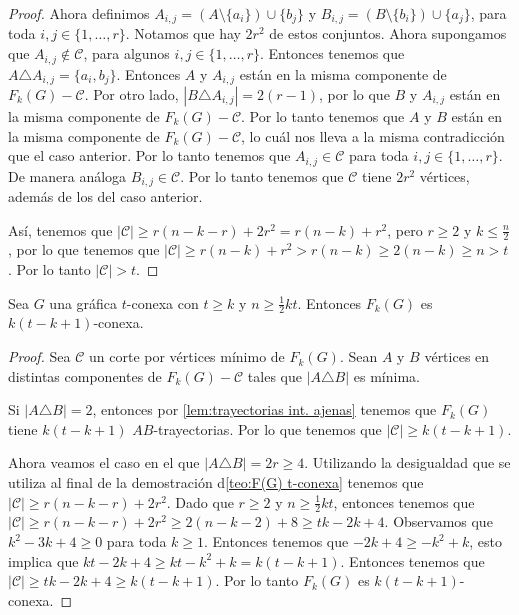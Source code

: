 \begin{proof}
Ahora definimos $A_{i,j} = (A\setminus \{a_i\}) \cup \{b_j\}$ y $B_{i,j} =
(B\setminus \{b_i\}) \cup \{a_j\}$, para toda $ i, j \in \{1, \dots, r\}$.
Notamos que hay $2r^2$ de estos conjuntos. Ahora supongamos que $A_{i,j} \notin
\mathcal{C}$, para algunos $ i, j \in \{1, \dots, r\}$. Entonces tenemos que $A
\triangle A_{i,j} = \{a_i, b_j\}$. Entonces $A$ y $A_{i,j}$ est\'an en la misma
componente de $F_k(G)- \mathcal{C}$. Por otro lado, $|B \triangle A_{i,j}| = 2
(r-1)$, por lo que $B$ y $A_{i,j}$ est\'an en la misma componente de $F_k(G) -
\mathcal{C}$. Por lo tanto tenemos que $A$ y $B$ est\'an en la misma componente
de $F_k(G)-\mathcal{C}$, lo cu\'al nos lleva a la misma contradicci\'on que el
caso anterior. Por lo tanto tenemos que $A_{i,j} \in \mathcal{C}$ para toda $i,
j \in \{1, \dots, r\}$. De manera an\'aloga $B_{i,j} \in \mathcal{C}$. Por lo
tanto tenemos que $\mathcal{C}$ tiene $2r^2$ v\'ertices, adem\'as de los del
caso anterior.

As\'i, tenemos que $|\mathcal{C}|\geq r(n-k-r)+2r^2 = r(n-k) + r^2$, pero $r
\geq 2$ y $k \leq \frac{n}{2}$, por lo que tenemos que $|\mathcal{C}| \geq
r(n-k)+r^2 > r(n-k) \geq 2(n-k) \geq n >t$. Por lo tanto $|\mathcal{C}|>t$.
\end{proof} 

\begin{teorema}%
    \label{teo:F(G) k (t- k+ 1)-conexa}
        Sea $G$ una gr\'afica $t$-conexa con $t \ge k$ y $n \ge \frac{1}{2} kt$.
        Entonces $F_{k}(G)$ es $k (t- k+ 1)$-conexa.
    \end{teorema}

    \begin{proof}
        Sea $\mathcal{C}$ un corte por v\'ertices m\'i{}nimo de $F_k(G)$. Sean
        $A$ y $B$ v\'ertices en distintas componentes de $F_k(G)- \mathcal{C}$
        tales que $|A \triangle B|$ es m\'i{}nima.

        Si $|A \triangle B| = 2$, entonces por \cref{lem:trayectorias int. ajenas} tenemos que
        $F_k(G)$ tiene $k (t- k+ 1)$ $AB$-trayectorias. Por lo que tenemos que
        $|\mathcal{C}| \geq k (t- k+ 1)$.

        Ahora veamos el caso en el que $|A \triangle B| = 2r \ge 4$. Utilizando
        la desigualdad que se utiliza al final de la demostraci\'on
        d\cref{teo:F(G) t-conexa} tenemos que $|\mathcal{C}| \ge r(n-k-r)+2r^2$. Dado
        que $r \ge 2$ y $n \ge \frac{1}{2}kt$, entonces tenemos que
        $|\mathcal{C}| \ge r(n-k-r)+2r^2 \ge 2 (n- k -2) + 8 \ge tk - 2k+ 4$.
        Observamos que $k^2 -3k + 4 \ge 0$ para toda $k \ge 1$. Entonces tenemos
        que $-2k+4 \ge -k^2 + k$, esto implica que $kt -2k +4 \ge kt - k^2 + k =
        k (t - k +1)$. Entonces tenemos que $|\mathcal{C}| \ge tk -2k +4 \ge
        k(t-k+1)$. Por lo tanto $F_k(G)$ es $k(t-k+1)$-conexa.
    \end{proof}